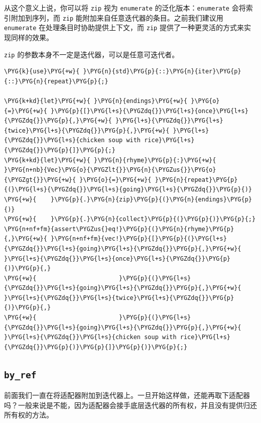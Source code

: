 从这个意义上说，你可以将 \texttt{zip} 视为 \texttt{enumerate} 的泛化版本：\texttt{enumerate} 会将索引附加到序列，而 \texttt{zip} 能附加来自任意迭代器的条目。之前我们建议用 \texttt{enumerate} 在处理条目时协助提供上下文，而 \texttt{zip} 提供了一种更灵活的方式来实现同样的效果。

\texttt{zip} 的参数本身不一定是迭代器，可以是任意可迭代者。

\begin{Verbatim}[commandchars=\\\{\},breaklines=true,breakanywhere=true,fontsize=\codefont,xleftmargin=17bp]
\PYG{k}{use}\PYG{+w}{ }\PYG{n}{std}\PYG{p}{::}\PYG{n}{iter}\PYG{p}{::}\PYG{n}{repeat}\PYG{p}{;}

\PYG{k+kd}{let}\PYG{+w}{ }\PYG{n}{endings}\PYG{+w}{ }\PYG{o}{=}\PYG{+w}{ }\PYG{p}{[}\PYG{l+s}{\PYGZdq{}}\PYG{l+s}{once}\PYG{l+s}{\PYGZdq{}}\PYG{p}{,}\PYG{+w}{ }\PYG{l+s}{\PYGZdq{}}\PYG{l+s}{twice}\PYG{l+s}{\PYGZdq{}}\PYG{p}{,}\PYG{+w}{ }\PYG{l+s}{\PYGZdq{}}\PYG{l+s}{chicken soup with rice}\PYG{l+s}{\PYGZdq{}}\PYG{p}{]}\PYG{p}{;}
\PYG{k+kd}{let}\PYG{+w}{ }\PYG{n}{rhyme}\PYG{p}{:}\PYG{+w}{ }\PYG{n+nb}{Vec}\PYG{o}{\PYGZlt{}}\PYG{n}{\PYGZus{}}\PYG{o}{\PYGZgt{}}\PYG{+w}{ }\PYG{o}{=}\PYG{+w}{ }\PYG{n}{repeat}\PYG{p}{(}\PYG{l+s}{\PYGZdq{}}\PYG{l+s}{going}\PYG{l+s}{\PYGZdq{}}\PYG{p}{)}
\PYG{+w}{    }\PYG{p}{.}\PYG{n}{zip}\PYG{p}{(}\PYG{n}{endings}\PYG{p}{)}
\PYG{+w}{    }\PYG{p}{.}\PYG{n}{collect}\PYG{p}{(}\PYG{p}{)}\PYG{p}{;}
\PYG{n+nf+fm}{assert\PYGZus{}eq!}\PYG{p}{(}\PYG{n}{rhyme}\PYG{p}{,}\PYG{+w}{ }\PYG{n+nf+fm}{vec!}\PYG{p}{[}\PYG{p}{(}\PYG{l+s}{\PYGZdq{}}\PYG{l+s}{going}\PYG{l+s}{\PYGZdq{}}\PYG{p}{,}\PYG{+w}{ }\PYG{l+s}{\PYGZdq{}}\PYG{l+s}{once}\PYG{l+s}{\PYGZdq{}}\PYG{p}{)}\PYG{p}{,}
\PYG{+w}{                       }\PYG{p}{(}\PYG{l+s}{\PYGZdq{}}\PYG{l+s}{going}\PYG{l+s}{\PYGZdq{}}\PYG{p}{,}\PYG{+w}{ }\PYG{l+s}{\PYGZdq{}}\PYG{l+s}{twice}\PYG{l+s}{\PYGZdq{}}\PYG{p}{)}\PYG{p}{,}
\PYG{+w}{                       }\PYG{p}{(}\PYG{l+s}{\PYGZdq{}}\PYG{l+s}{going}\PYG{l+s}{\PYGZdq{}}\PYG{p}{,}\PYG{+w}{ }\PYG{l+s}{\PYGZdq{}}\PYG{l+s}{chicken soup with rice}\PYG{l+s}{\PYGZdq{}}\PYG{p}{)}\PYG{p}{]}\PYG{p}{)}\PYG{p}{;}
\end{Verbatim}

\subsection{\texttt{by\_ref}}

前面我们一直在将适配器附加到迭代器上。一旦开始这样做，还能再取下适配器吗？一般来说是不能，因为适配器会接手底层迭代器的所有权，并且没有提供归还所有权的方法。

